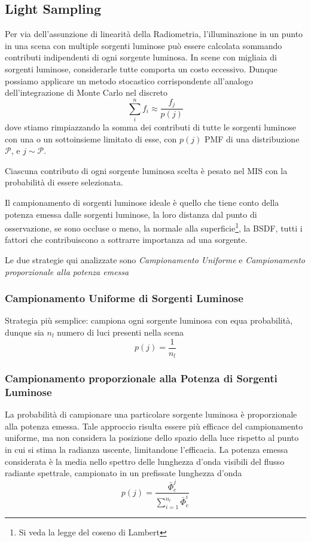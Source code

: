 \subsection{Light Sampling}
Per via dell'assunzione di linearit\`a della Radiometria, l'illuminazione in un punto in una scena con multiple sorgenti luminose pu\`o essere 
calcolata sommando contributi indipendenti di ogni sorgente luminosa. In scene con migliaia di sorgenti luminose, considerarle tutte comporta un 
costo eccessivo. Dunque possiamo applicare un metodo stocastico corrispondente all'analogo dell'integrazione di Monte Carlo nel discreto 
\cite{pharr}
\begin{equation}
	\sum_i^nf_i\approx\frac{f_j}{p(j)}
\end{equation}
dove stiamo rimpiazzando la somma dei contributi di tutte le sorgenti luminose con una o un sottoinsieme limitato di esse, con $p(j)$ PMF di 
una distribuzione $\mathcal{P}$, e $j\sim\mathcal{P}$.\par
Ciascuna contributo di ogni sorgente luminosa scelta \`e pesato nel MIS con la probabilit\`a di essere selezionata.\par 
Il campionamento di sorgenti luminose ideale \`e quello che tiene conto della potenza emessa dalle sorgenti luminose, la loro distanza dal 
punto di osservazione, se sono occluse o meno, la normale alla superficie\footnote{Si veda la legge del coseno di Lambert}, la BSDF, tutti i fattori 
che contribuiscono a sottrarre importanza ad una sorgente.\par
Le due strategie qui analizzate sono \textit{Campionamento Uniforme} e \textit{Campionamento proporzionale alla potenza emessa}
\subsubsection{Campionamento Uniforme di Sorgenti Luminose}
Strategia pi\`u semplice: campiona ogni sorgente luminosa con equa probabilit\`a, dunque sia $n_l$ numero di luci presenti nella scena
\begin{equation}
	p(j)=\frac{1}{n_l}
\end{equation}
\subsubsection{Campionamento proporzionale alla Potenza di Sorgenti Luminose}
La probabilit\`a di campionare una particolare sorgente luminosa \`e proporzionale alla potenza emessa. Tale approccio risulta essere pi\`u efficace
del campionamento uniforme, ma non considera la posizione dello spazio della luce rispetto al punto in cui si stima la radianza uscente, limitandone
l'efficacia. La potenza emessa considerata \`e la media nello spettro delle lunghezza d'onda visibili del flusso radiante spettrale, campionato in 
un prefissate lunghezza d'onda 
\begin{equation}
	p(j)=\frac{\bar{\Phi}_{e}^j}{\sum_{i=1}^{n_l}\bar{\Phi}_{e}^i}
\end{equation}

